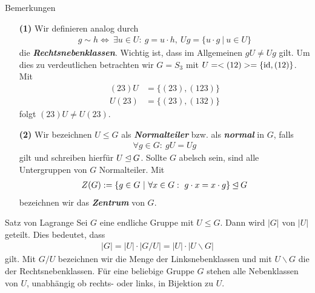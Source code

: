\begin{genericdf}{Bemerkungen}\label{1.13} \ 
\begin{enumerate}
\item[\textbf{(1)}] 
Wir definieren analog durch
\begin{align*}
g \sim h \Leftrightarrow \ \exists u \in U: \ g = u \cdot h, \ Ug = \lbrace u \cdot g \ | \ u \in U \rbrace
\end{align*}
die \textbf{\textit{Rechtsnebenklassen}}.
Wichtig ist, dass im Allgemeinen $gU \neq Ug$ gilt.
Um dies zu verdeutlichen betrachten wir $G = S_3$ mit $U= <(12)> = \lbrace \operatorname{id}, (12)\rbrace $.
Mit 
\begin{align*}
(23)U &= \lbrace (23),(123) \rbrace \\
U(23) &= \lbrace(23),(132) \rbrace 
\end{align*}
folgt $(23)U  \neq U(23)$.
\item[\textbf{(2)}]  
Wir bezeichnen $U \leq G$ als \textbf{\textit{Normalteiler}} bzw. als \textbf{\textit{normal}} in $G$, falls
\begin{align*}
\forall g \in G: \ gU = Ug
\end{align*}
gilt und schreiben hierfür $ U \unlhd G$.
Sollte $G$ abelsch sein, sind alle Untergruppen von $G$ Normalteiler.
Mit \index{Zentrum}
\begin{align*}
Z(G) := \lbrace g \in G \ | \ \forall x \in G: \ g\cdot x = x \cdot g \rbrace \unlhd G
\end{align*}
bezeichnen wir das \textit{\textbf{Zentrum}} von $G$.
\end{enumerate}
\end{genericdf}

\begin{genericthm}{Satz von Lagrange}\label{1.14} 
Sei $G$ eine endliche Gruppe mit $U \leq G$. Dann wird $|G|$ von $|U|$ geteilt.
Dies bedeutet, dass
\begin{align*}
|G| =|U| \cdot |G  	/ U | = |U| \cdot |U  	\backslash  G |
\end{align*}
gilt. Mit $G  	/  U$ bezeichnen wir die Menge der Linksnebenklassen und mit
$U  	\backslash  G$ die der Rechtsnebenklassen.
Für eine beliebige Gruppe $G$ stehen alle Nebenklassen von $U$, unabhängig ob rechts- oder links, in Bijektion zu $U$. 
\end{genericthm}

